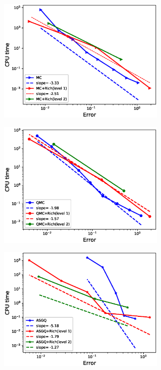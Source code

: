 \documentclass[ima, 20pt, portrait, plainboxedsections]{sciposter}
\begin{document}
\begin{multicols}{3}
\begin{figure}
	\centering
	\begin{subfigure}{0.45\textwidth}
		\centering
		\includegraphics[width=0.9\textwidth]{./rBergomi_Complexity_rates/set2/error_vs_time_set2_MC_comparison}
		\caption{}
	\end{subfigure}
	\begin{subfigure}{0.45\textwidth}
		\centering
		\includegraphics[width=0.9\textwidth]{./rBergomi_Complexity_rates/set2/error_vs_time_set2_QMC_comparison}
		\caption{}
	\end{subfigure}
	\begin{subfigure}{0.45\textwidth}
		\centering
		\includegraphics[width=0.9\textwidth]{./rBergomi_Complexity_rates/set2/error_vs_time_set2_MISC_comparison}

\end{subfigure}
\end{figure}
\end{multicols}
\end{document}
